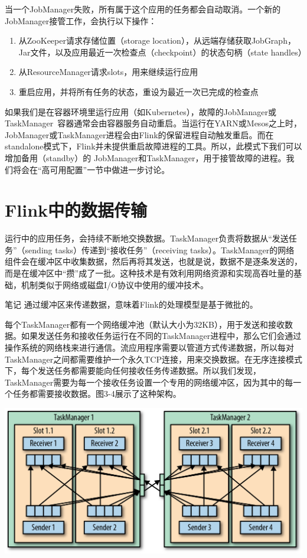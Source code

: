 \documentclass[oneside]{ctexbook}
\begin{document}
当一个JobManager失败，所有属于这个应用的任务都会自动取消。一个新的JobManager接管工作，会执行以下操作：

\begin{enumerate}
  \item 从ZooKeeper请求存储位置（storage location），从远端存储获取JobGraph，Jar文件，以及应用最近一次检查点（checkpoint）的状态句柄（state handles）
  \item 从ResourceManager请求slots，用来继续运行应用
  \item 重启应用，并将所有任务的状态，重设为最近一次已完成的检查点
\end{enumerate}

如果我们是在容器环境里运行应用（如Kubernetes），故障的JobManager或TaskManager 容器通常会由容器服务自动重启。当运行在YARN或Mesos之上时，JobManager或TaskManager进程会由Flink的保留进程自动触发重启。而在standalone模式下，Flink并未提供重启故障进程的工具。所以，此模式下我们可以增加备用（standby）的 JobManager和TaskManager，用于接管故障的进程。我们将会在“高可用配置”一节中做进一步讨论。

\section{Flink中的数据传输}

运行中的应用任务，会持续不断地交换数据。TaskManager负责将数据从“发送任务”（sending tasks）传递到“接收任务”（receiving tasks）。TaskManager的网络组件会在缓冲区中收集数据，然后再将其发送，也就是说，数据不是逐条发送的，而是在缓冲区中“攒”成了一批。这种技术是有效利用网络资源和实现高吞吐量的基础，机制类似于网络或磁盘I/O协议中使用的缓冲技术。

\begin{bclogo}[logo=\bcinfo, couleurBarre=orange, noborder=true, couleur=white]{笔记}
通过缓冲区来传递数据，意味着Flink的处理模型是基于微批的。
\end{bclogo}

每个TaskManager都有一个网络缓冲池（默认大小为32KB），用于发送和接收数据。如果发送任务和接收任务运行在不同的TaskManager进程中，那么它们会通过操作系统的网络栈来进行通信。流应用程序需要以管道方式传递数据，所以每对TaskManager之间都需要维护一个永久TCP连接，用来交换数据。在无序连接模式下，每个发送任务都需要能向任何接收任务传递数据。所以我们发现，TaskManager需要为每一个接收任务设置一个专用的网络缓冲区，因为其中的每一个任务都需要接收数据。图3-4展示了这种架构。

\noindent \includegraphics[width=\textwidth]{spaf_0304.png}
\end{document}
